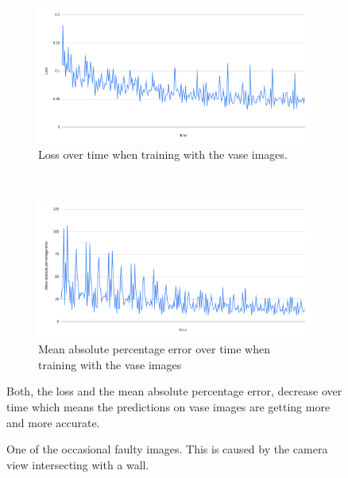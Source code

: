 \begin{figure}[h!]
	\centering
	\begin{subfigure}[t]{0.8\textwidth}
		\centering
		\includegraphics[width=\textwidth]{img/experiment1_results_lossOverTime.png}
		\caption{Loss over time when training with the vase images.}
	\end{subfigure}
	~ 
	\begin{subfigure}[t]{0.8\textwidth}
		\centering
		\includegraphics[width=\textwidth]{img/experiment1_results_MeanAbsolutePercentageErrorOverTime.png}
		\caption{Mean absolute percentage error over time when training with the vase images}
	\end{subfigure}
	\caption{Both, the loss and the mean absolute percentage error, decrease over time which means the predictions on vase images are getting more and more accurate.}
	\label{pic:experiment1_results_loss_and_percentageLoss}
\end{figure}

\begin{figure}[h!]
	\centering
	\caption{One of the occasional faulty images. This is caused by the camera view intersecting with a wall.}
	\label{pic:experiment1_results_faultyImage}
\end{figure}

